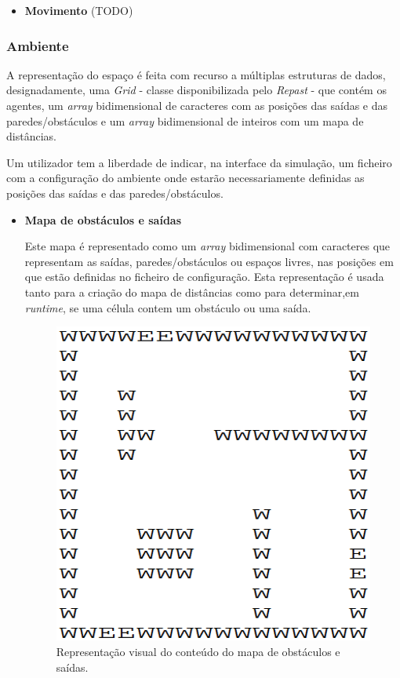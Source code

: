 \documentclass[12pt]{article}
\begin{document}
\begin{titlepage}
\begin{itemize}
\item \textbf{Movimento}
(TODO)


\end{itemize}

\subsubsection{Ambiente}
A representação do espaço é feita com recurso a múltiplas estruturas de dados, designadamente, uma \textit{Grid} - classe disponibilizada pelo \textit{Repast} - que contém os agentes, um \textit{array} bidimensional de caracteres com as posições das saídas e das paredes/obstáculos e um \textit{array} bidimensional de inteiros com um mapa de distâncias. 

Um utilizador tem a liberdade de indicar, na interface da simulação, um ficheiro com a configuração do ambiente onde estarão necessariamente definidas as posições das saídas e das paredes/obstáculos.

\begin{itemize}

\item \textbf{Mapa de obstáculos e saídas}

Este mapa é representado como um \textit{array} bidimensional com caracteres que representam as saídas, paredes/obstáculos ou espaços livres, nas posições em que estão definidas no ficheiro de configuração. Esta representação é usada tanto para a criação do mapa de distâncias como para determinar,em \textit{runtime}, se uma célula contem um obstáculo ou uma saída.

\begin{figure}[H]
	\centering
	\includegraphics[scale=0.2]{map_text.png}
	\caption{Representação visual do conteúdo do mapa de obstáculos e saídas.}
	\label{map}
\end{figure}


\end{itemize}
\end{titlepage}
\end{document}
